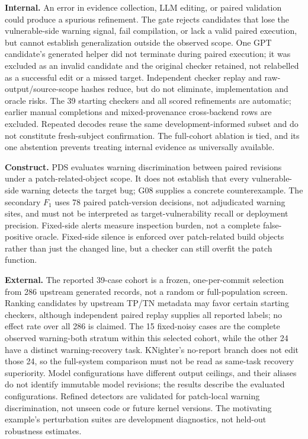\noindent\textbf{Internal.}
An error in evidence collection, LLM editing, or paired validation could produce a spurious refinement. The gate rejects candidates that lose the vulnerable-side warning signal, fail compilation, or lack a valid paired execution, but cannot establish generalization outside the observed scope. One GPT candidate's generated helper did not terminate during paired execution; it was excluded as an invalid candidate and the original checker retained, not relabelled as a successful edit or a missed target. Independent checker replay and raw-output/source-scope hashes reduce, but do not eliminate, implementation and oracle risks. The 39 starting checkers and all scored refinements are automatic; earlier manual completions and mixed-provenance cross-backend rows are excluded. Repeated decodes reuse the same development-informed subset and do not constitute fresh-subject confirmation. The full-cohort ablation is tied, and its one abstention prevents treating internal evidence as universally available.

\noindent\textbf{Construct.}
PDS evaluates warning discrimination between paired revisions under a patch-related-object scope. It does not establish that every vulnerable-side warning detects the target bug; G08 supplies a concrete counterexample. The secondary $F_1$ uses 78 paired patch-version decisions, not adjudicated warning sites, and must not be interpreted as target-vulnerability recall or deployment precision. Fixed-side alerts measure inspection burden, not a complete false-positive oracle. Fixed-side silence is enforced over patch-related build objects rather than just the changed line, but a checker can still overfit the patch function.

\noindent\textbf{External.}
The reported 39-case cohort is a frozen, one-per-commit selection from 286 upstream generated records, not a random or full-population screen. Ranking candidates by upstream TP/TN metadata may favor certain starting checkers, although independent paired replay supplies all reported labels; no effect rate over all 286 is claimed. The 15 fixed-noisy cases are the complete observed warning-both stratum within this selected cohort, while the other 24 have a distinct warning-recovery task. KNighter's no-report branch does not edit those 24, so the full-system comparison must not be read as same-task recovery superiority. Model configurations have different output ceilings, and their aliases do not identify immutable model revisions; the results describe the evaluated configurations. Refined detectors are validated for patch-local warning discrimination, not unseen code or future kernel versions. The motivating example's perturbation suites are development diagnostics, not held-out robustness estimates.
